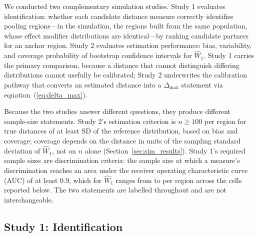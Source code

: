 \documentclass[AMA,Times1COL]{WileyNJDv5}
\begin{document}
We conducted two complementary simulation studies. Study 1 evaluates identification: whether each candidate distance measure correctly identifies pooling regions---in the simulation, the regions built from the same population, whose effect modifier distributions are identical---by ranking candidate partners for an anchor region. Study 2 evaluates estimation performance: bias, variability, and coverage probability of bootstrap confidence intervals for $\widehat{W}_1$. Study 1 carries the primary comparison, because a distance that cannot distinguish differing distributions cannot usefully be calibrated; Study 2 underwrites the calibration pathway that converts an estimated distance into a $\Delta_{\max}$ statement via equation~(\ref{eq:delta_max}).

Because the two studies answer different questions, they produce different sample-size statements. Study 2's estimation criterion is $n \geq 100$ per region for true distances of at least  SD of the reference distribution, based on bias and coverage; coverage depends on the distance in units of the sampling standard deviation of $\widehat{W}_1$, not on $n$ alone (Section~\ref{sec:sim_results}). Study 1's required sample sizes are discrimination criteria: the sample size at which a measure's discrimination reaches an area under the receiver operating characteristic curve (AUC) of at least 0.9, which for $\widehat{W}_1$ ranges from  to  per region across the cells reported below. The two statements are labelled throughout and are not interchangeable.

\subsection{Study 1: Identification}\label{sec:study1}
\end{document}
